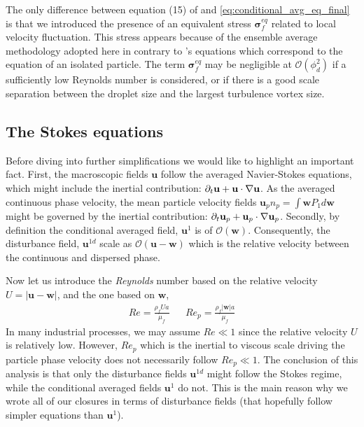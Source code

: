 The only difference between equation (15) of \citep{maxey1983equation} and \ref{eq:conditional_avg_eq_final} is that we introduced the presence of an equivalent stress $\bm\sigma_f^{eq}$ related to local velocity fluctuation. 
This stress appears because of the ensemble average methodology adopted here in contrary to \citep{maxey1983equation}'s equations which correspond to the equation of an isolated particle. 
The term $\bm\sigma_f^{eq}$ may be negligible at $\mathcal{O}(\phi_d^2)$ if a sufficiently low Reynolds number is considered, or if there is a good scale separation between the droplet size and the largest turbulence vortex size. 




\subsection{The Stokes equations}

Before diving into further simplifications we would like to highlight an important fact. 
First, the macroscopic fields $\textbf{u}$ follow the averaged Navier-Stokes equations, which might include the inertial contribution: $\partial_t \textbf{u} + \textbf{u}\cdot \mathbf{\nabla} \textbf{u}$. 
As the averaged continuous phase velocity, the mean particle velocity fields $\textbf{u}_p n_p= \int \textbf{w} P_1d\textbf{w}$ might be governed by the inertial contribution: $\partial_t \textbf{u}_p + \textbf{u}_p\cdot \mathbf{\nabla} \textbf{u}_p$.   
Secondly, by definition the conditional averaged field, $\textbf{u}^{1}$ is of $\mathcal{O}(\textbf{w})$. 
Consequently, the disturbance field, $\textbf{u}^{1d}$ scale as $\mathcal{O}(\textbf{u} - \textbf{w})$ which is the relative velocity between the continuous and dispersed phase. 

Now let us introduce the \textit{Reynolds} number based on the relative velocity $U =|\textbf{u}- \textbf{w}|$, and the one based on $\textbf{w}$, 
\begin{align}
    Re = \frac{\rho_f U a}{\mu_f} && 
    Re_p = \frac{\rho_f |\textbf{w}| a}{\mu_f} 
\end{align} 
In many industrial processes, we may assume $Re \ll 1$ since the relative velocity $U$ is relatively low. 
However, $Re_p$ which is the inertial to viscous scale driving the particle phase velocity does not necessarily follow $Re_p \ll 1$.  
The conclusion of this analysis is that only the disturbance fields $\textbf{u}^{1d}$ might follow the Stokes regime, while the conditional averaged fields $\textbf{u}^1$ do not. 
This is the main reason why we wrote all of our closures in terms of disturbance fields (that hopefully follow simpler equations than $\textbf{u}^1$). 

